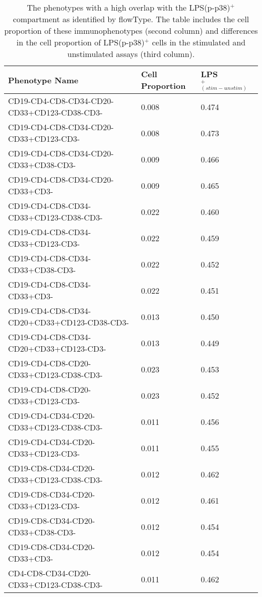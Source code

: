 \begin{table}[ht]\footnotesize
  \begin{center}
    \caption{The phenotypes with a high overlap with the LPS(p-p38)$^+$ compartment as identified by flowType. The table includes the cell proportion of these immunophenotypes (second column) and differences in the cell proportion of LPS(p-p38)$^+$ cells in the stimulated and unstimulated assays (third column).}
    \label{apx:LPS}
    \begin{tabular}{lll}
      \hline
      Phenotype Name & Cell Proportion & LPS$^+_{(stim-unstim)}$ \\ 
      \hline
      CD19-CD4-CD8-CD34-CD20-CD33+CD123-CD38-CD3- & 0.008 & 0.474 \\ 
      CD19-CD4-CD8-CD34-CD20-CD33+CD123-CD3- & 0.008 & 0.473 \\ 
      CD19-CD4-CD8-CD34-CD20-CD33+CD38-CD3- & 0.009 & 0.466 \\ 
      CD19-CD4-CD8-CD34-CD20-CD33+CD3- & 0.009 & 0.465 \\ 
      CD19-CD4-CD8-CD34-CD33+CD123-CD38-CD3- & 0.022 & 0.460 \\ 
      CD19-CD4-CD8-CD34-CD33+CD123-CD3- & 0.022 & 0.459 \\ 
      CD19-CD4-CD8-CD34-CD33+CD38-CD3- & 0.022 & 0.452 \\ 
      CD19-CD4-CD8-CD34-CD33+CD3- & 0.022 & 0.451 \\ 
      CD19-CD4-CD8-CD34-CD20+CD33+CD123-CD38-CD3- & 0.013 & 0.450 \\ 
      CD19-CD4-CD8-CD34-CD20+CD33+CD123-CD3- & 0.013 & 0.449 \\ 
      CD19-CD4-CD8-CD20-CD33+CD123-CD38-CD3- & 0.023 & 0.453 \\ 
      CD19-CD4-CD8-CD20-CD33+CD123-CD3- & 0.023 & 0.452 \\ 
      CD19-CD4-CD34-CD20-CD33+CD123-CD38-CD3- & 0.011 & 0.456 \\ 
      CD19-CD4-CD34-CD20-CD33+CD123-CD3- & 0.011 & 0.455 \\ 
      CD19-CD8-CD34-CD20-CD33+CD123-CD38-CD3- & 0.012 & 0.462 \\ 
      CD19-CD8-CD34-CD20-CD33+CD123-CD3- & 0.012 & 0.461 \\ 
      CD19-CD8-CD34-CD20-CD33+CD38-CD3- & 0.012 & 0.454 \\ 
      CD19-CD8-CD34-CD20-CD33+CD3- & 0.012 & 0.454 \\ 
      CD4-CD8-CD34-CD20-CD33+CD123-CD38-CD3- & 0.011 & 0.462 \\ 

\end{tabular}
\end{center}
\end{table}
